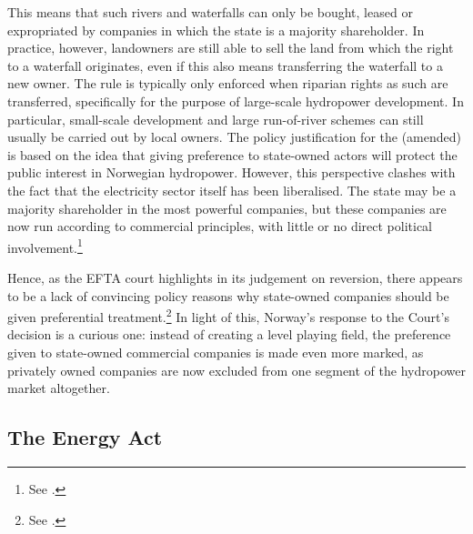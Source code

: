 This means that such rivers and waterfalls can only be bought, leased or expropriated by companies in which the state is a majority shareholder. In practice, however, landowners are still able to sell the land from which the right to a waterfall originates, even if this also means transferring the waterfall to a new owner. The rule is typically only enforced when riparian rights as such are transferred, specifically for the purpose of large-scale hydropower development. In particular, small-scale development and large run-of-river schemes can still usually be carried out by local owners. The policy justification for the (amended) \cite{ica17} is based on the idea that giving preference to state-owned actors will protect the public interest in Norwegian hydropower. However, this perspective clashes with the fact that the electricity sector itself has been liberalised. The state may be a majority shareholder in the most powerful companies, but these companies are now run according to commercial principles, with little or no direct political involvement.\footnote{See \cite[86]{efta07}.}

Hence, as the EFTA court highlights in its judgement on reversion, there appears to be a lack of convincing policy reasons why state-owned companies should be given preferential treatment.\footnote{See \cite[84-87]{efta07}.} In light of this, Norway's response to the Court's decision is a curious one: instead of creating a level playing field, the preference given to state-owned commercial companies is made even more marked, as privately owned companies are now excluded from one segment of the hydropower market altogether.


\subsection{The Energy Act}\label{sec:ea}


